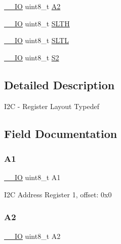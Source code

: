 \begin{DoxyCompactItemize}
\item 
\mbox{\hyperlink{core__cm0plus_8h_aec43007d9998a0a0e01faede4133d6be}{\+\_\+\+\_\+\+IO}} uint8\+\_\+t \mbox{\hyperlink{struct_i2_c___type_ae8436760942c43a7f6b6b8561803dfd7}{A2}}
\item 
\mbox{\hyperlink{core__cm0plus_8h_aec43007d9998a0a0e01faede4133d6be}{\+\_\+\+\_\+\+IO}} uint8\+\_\+t \mbox{\hyperlink{struct_i2_c___type_ae84d7b4597381d16c807ac8c0f77b12c}{S\+L\+TH}}
\item 
\mbox{\hyperlink{core__cm0plus_8h_aec43007d9998a0a0e01faede4133d6be}{\+\_\+\+\_\+\+IO}} uint8\+\_\+t \mbox{\hyperlink{struct_i2_c___type_ae154cfc39aa9ad234093c3a7a469a27d}{S\+L\+TL}}
\item 
\mbox{\hyperlink{core__cm0plus_8h_aec43007d9998a0a0e01faede4133d6be}{\+\_\+\+\_\+\+IO}} uint8\+\_\+t \mbox{\hyperlink{struct_i2_c___type_aafdaf251d5cfeb18803536542a880459}{S2}}
\end{DoxyCompactItemize}


\subsection{Detailed Description}
I2C -\/ Register Layout Typedef 

\subsection{Field Documentation}
\mbox{\label{struct_i2_c___type_acb6a1bc3db8fa6148894140daa6b97e1}} 
\subsubsection{\texorpdfstring{A1}{A1}}
{\footnotesize\ttfamily \mbox{\hyperlink{core__cm0plus_8h_aec43007d9998a0a0e01faede4133d6be}{\+\_\+\+\_\+\+IO}} uint8\+\_\+t A1}

I2C Address Register 1, offset\+: 0x0 \mbox{\label{struct_i2_c___type_ae8436760942c43a7f6b6b8561803dfd7}} 
\subsubsection{\texorpdfstring{A2}{A2}}
{\footnotesize\ttfamily \mbox{\hyperlink{core__cm0plus_8h_aec43007d9998a0a0e01faede4133d6be}{\+\_\+\+\_\+\+IO}} uint8\+\_\+t A2}

